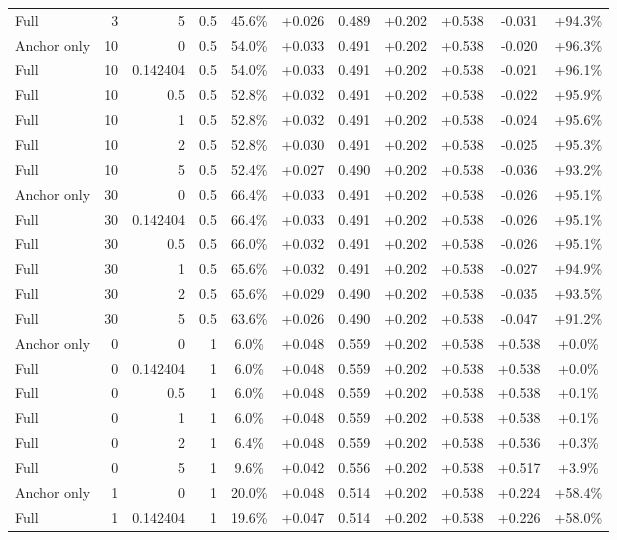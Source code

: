 \begin{table}[htbp]
\begin{tabular}{lrrrccccccc}
Full & 3 & 5 & 0.5 & 45.6\% & +0.026 & 0.489 & +0.202 & +0.538 & -0.031 & +94.3\% \\
Anchor only & 10 & 0 & 0.5 & 54.0\% & +0.033 & 0.491 & +0.202 & +0.538 & -0.020 & +96.3\% \\
Full & 10 & 0.142404 & 0.5 & 54.0\% & +0.033 & 0.491 & +0.202 & +0.538 & -0.021 & +96.1\% \\
Full & 10 & 0.5 & 0.5 & 52.8\% & +0.032 & 0.491 & +0.202 & +0.538 & -0.022 & +95.9\% \\
Full & 10 & 1 & 0.5 & 52.8\% & +0.032 & 0.491 & +0.202 & +0.538 & -0.024 & +95.6\% \\
Full & 10 & 2 & 0.5 & 52.8\% & +0.030 & 0.491 & +0.202 & +0.538 & -0.025 & +95.3\% \\
Full & 10 & 5 & 0.5 & 52.4\% & +0.027 & 0.490 & +0.202 & +0.538 & -0.036 & +93.2\% \\
Anchor only & 30 & 0 & 0.5 & 66.4\% & +0.033 & 0.491 & +0.202 & +0.538 & -0.026 & +95.1\% \\
Full & 30 & 0.142404 & 0.5 & 66.4\% & +0.033 & 0.491 & +0.202 & +0.538 & -0.026 & +95.1\% \\
Full & 30 & 0.5 & 0.5 & 66.0\% & +0.032 & 0.491 & +0.202 & +0.538 & -0.026 & +95.1\% \\
Full & 30 & 1 & 0.5 & 65.6\% & +0.032 & 0.491 & +0.202 & +0.538 & -0.027 & +94.9\% \\
Full & 30 & 2 & 0.5 & 65.6\% & +0.029 & 0.490 & +0.202 & +0.538 & -0.035 & +93.5\% \\
Full & 30 & 5 & 0.5 & 63.6\% & +0.026 & 0.490 & +0.202 & +0.538 & -0.047 & +91.2\% \\
Anchor only & 0 & 0 & 1 & 6.0\% & +0.048 & 0.559 & +0.202 & +0.538 & +0.538 & +0.0\% \\
Full & 0 & 0.142404 & 1 & 6.0\% & +0.048 & 0.559 & +0.202 & +0.538 & +0.538 & +0.0\% \\
Full & 0 & 0.5 & 1 & 6.0\% & +0.048 & 0.559 & +0.202 & +0.538 & +0.538 & +0.1\% \\
Full & 0 & 1 & 1 & 6.0\% & +0.048 & 0.559 & +0.202 & +0.538 & +0.538 & +0.1\% \\
Full & 0 & 2 & 1 & 6.4\% & +0.048 & 0.559 & +0.202 & +0.538 & +0.536 & +0.3\% \\
Full & 0 & 5 & 1 & 9.6\% & +0.042 & 0.556 & +0.202 & +0.538 & +0.517 & +3.9\% \\
Anchor only & 1 & 0 & 1 & 20.0\% & +0.048 & 0.514 & +0.202 & +0.538 & +0.224 & +58.4\% \\
Full & 1 & 0.142404 & 1 & 19.6\% & +0.047 & 0.514 & +0.202 & +0.538 & +0.226 & +58.0\% \\

\end{tabular}
\end{table}
